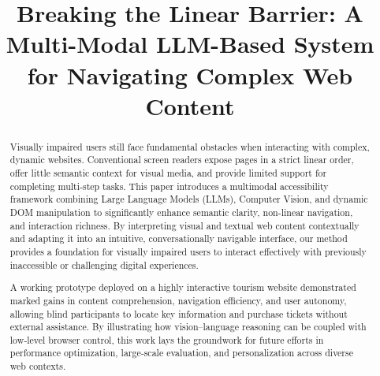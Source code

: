 \documentclass[conference]{IEEEtran}
\begin{document}
\title{Breaking the Linear Barrier: A Multi-Modal LLM-Based System for Navigating Complex Web Content}


\maketitle

\begin{abstract}
Visually impaired users still face fundamental obstacles when interacting with complex, dynamic websites. Conventional screen readers expose pages in a strict linear order, offer little semantic context for visual media, and provide limited support for completing multi‑step tasks. This paper introduces a multimodal accessibility framework combining Large Language Models (LLMs), Computer Vision, and dynamic DOM manipulation to significantly enhance semantic clarity, non-linear navigation, and interaction richness. By interpreting visual and textual web content contextually and adapting it into an intuitive, conversationally navigable interface, our method provides a foundation for visually impaired users to interact effectively with previously inaccessible or challenging digital experiences.

A working prototype deployed on a highly interactive tourism website demonstrated marked gains in content comprehension, navigation efficiency, and user autonomy, allowing blind participants to locate key information and purchase tickets without external assistance. By illustrating how vision–language reasoning can be coupled with low‑level browser control, this work lays the groundwork for future efforts in performance optimization, large‑scale evaluation, and personalization across diverse web contexts.
\end{abstract}
\end{document}
